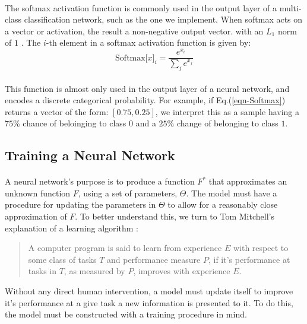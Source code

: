 \documentclass[12pt,letterpaper]{article}
\begin{document}
\paragraph*{}The softmax activation function is commonly used in the output layer of a multi-class classification network, such as the one we implement. When softmax acts on a vector or activation, the result a non-negative output vector. with an $L_1$ norm of $1$ \cite{Geron,Goodfellow,Virtanen}. The $i$-th element in a softmax activation function is given by:
\begin{equation}
\label{eqn-Softmax}
\text{Softmax}\big[ x \big]_{i} = \frac{e^{x_i}}{\sum_{j}e^{x_j}}
\end{equation}

\paragraph*{}This function is almost only used in the output layer of a neural network, and encodes a discrete categorical probability. For example, if Eq.(\ref{eqn-Softmax}) returns a vector of the form: $[ 0.75 , 0.25]$, we interpret this as a sample having a $75\%$ chance of beloinging to class $0$ and a $25\%$ change of belonging to class $1$.



\subsection{Training a Neural Network}
\label{subsec-Training}

\paragraph*{}A neural network's purpose is to produce a function $F^*$ that approximates an unknown function $F$, using a set of parameters, $\Theta$. The model must have a procedure for updating the parameters in $\Theta$ to allow for a reasonably close approximation of $F$. To better understand this, we turn to Tom Mitchell's explanation of a learning algorithm \cite{Goodfellow,Mitchell}:
\begin{quote}
A computer program is said to learn from experience $E$ with respect to some class of tasks $T$ and performance measure $P$, if it's performance at tasks in $T$, as measured by $P$, improves with experience $E$.
\end{quote}
Without any direct human intervention, a model must update itself to improve it's performance at a give task a new information is presented to it. To do this, the model must be constructed with a training procedure in mind. 
\end{document}
